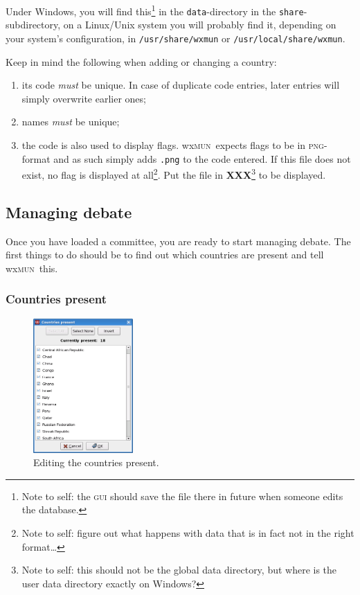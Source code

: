 \documentclass[11pt, a4paper]{article}
\newcommand\wxMUN{wx\textsc{mun}}
\begin{document}
Under Windows, you will find this\footnote{Note to self: the \textsc{gui} should save the file there in future when someone edits the database.} in the \texttt{data}-directory in the \texttt{share}-subdirectory, on a Linux/Unix system you will probably find it, depending on your system's configuration, in \texttt{/usr/share/wxmun} or \texttt{/usr/local/share/wxmun}.

Keep in mind the following when adding or changing a country:
\begin{enumerate}
\item its code \emph{must} be unique. In case of duplicate code entries, later entries will simply overwrite earlier ones;
\item names \emph{must} be unique;
\item the code is also used to display flags. \wxMUN\ expects flags to be in \textsc{png}-format and as such simply adds \texttt{.png} to the code 
entered. If this file does not exist, no flag is displayed at all\footnote{Note to self: figure out what happens with data that is in fact not in the right format\ldots}. Put the file in \textbf{XXX}\footnote{Note to self: this should not be the global data directory, but where is the user data directory exactly on Windows?} to be displayed.
\end{enumerate}

\subsection{Managing debate}
Once you have loaded a committee, you are ready to start managing debate. The first things to do should be to find out which countries are present and tell \wxMUN\ this.
\subsubsection{Countries present}
\begin{figure}
\includegraphics[width=0.34\textwidth]{screenshots/countries_present.png}
\caption{Editing the countries present.}
\end{figure}
\end{document}
